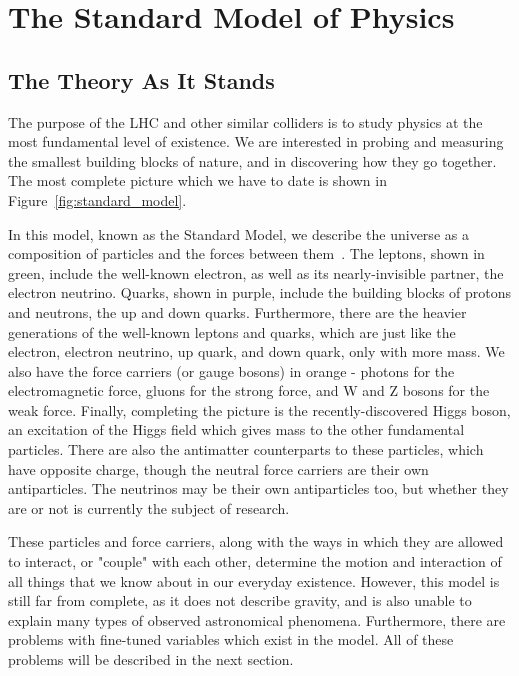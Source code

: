 \chapter{The Standard Model of Physics}\label{chap:SM}

\section{The Theory As It Stands}

The purpose of the LHC and other similar colliders is to study physics at the most fundamental level of existence. We are interested in probing and measuring the smallest building blocks of nature, and in discovering how they go together. The most complete picture which we have to date is shown in Figure~\ref{fig:standard_model}.

In this model, known as the Standard Model, we describe the universe as a composition of particles and the forces between them~\cite{Griffiths}. The leptons, shown in green, include the well-known electron, as well as its nearly-invisible partner, the electron neutrino. Quarks, shown in purple, include the building blocks of protons and neutrons, the up and down quarks. Furthermore, there are the heavier generations of the well-known leptons and quarks, which are just like the electron, electron neutrino, up quark, and down quark, only with more mass. We also have the force carriers (or gauge bosons) in orange - photons for the electromagnetic force, gluons for the strong force, and W and Z bosons for the weak force. Finally, completing the picture is the recently-discovered Higgs boson, an excitation of the Higgs field which gives mass to the other fundamental particles. There are also the antimatter counterparts to these particles, which have opposite charge, though the neutral force carriers are their own antiparticles. The neutrinos may be their own antiparticles too, but whether they are or not is currently the subject of research.

These particles and force carriers, along with the ways in which they are allowed to interact, or "couple" with each other, determine the motion and interaction of all things that we know about in our everyday existence. However, this model is still far from complete, as it does not describe gravity, and is also unable to explain many types of observed astronomical phenomena. Furthermore, there are problems with fine-tuned variables which exist in the model. All of these problems will be described in the next section.

